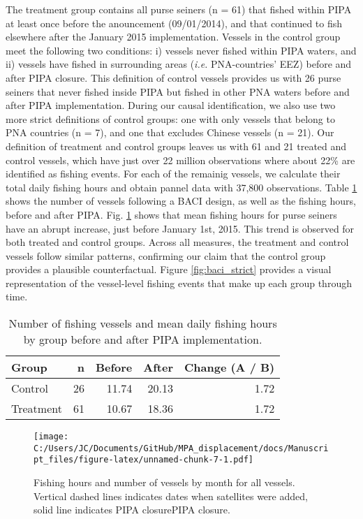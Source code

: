 \documentclass[11pt,]{article}
\begin{document}
The treatment group contains all purse seiners (n = 61) that fished
within PIPA at least once before the anouncement (09/01/2014), and that
continued to fish elsewhere after the January 2015 implementation.
Vessels in the control group meet the following two conditions: i)
vessels never fished within PIPA waters, and ii) vessels have fished in
surrounding areas (\emph{i.e.} PNA-countries' EEZ) before and after PIPA
closure. This definition of control vessels provides us with 26 purse
seiners that never fished inside PIPA but fished in other PNA waters
before and after PIPA implementation. During our causal identification,
we also use two more strict definitions of control groups: one with only
vessels that belong to PNA countries (n = 7), and one that excludes
Chinese vessels (n = 21). Our definition of treatment and control groups
leaves us with 61 and 21 treated and control vessels, which have just
over 22 million observations where about 22\% are identified as fishing
events. For each of the remainig vessels, we calculate their total daily
fishing hours and obtain pannel data with 37,800 observations. Table
\ref{tab:baci_n_s} shows the number of vessels following a BACI design,
as well as the fishing hours, before and after PIPA. Fig.
\ref{fig:all_vessels} shows that mean fishing hours for purse seiners
have an abrupt increase, just before January 1st, 2015. This trend is
observed for both treated and control groups. Across all measures, the
treatment and control vessels follow similar patterns, confirming our
claim that the control group provides a plausible counterfactual. Figure
\ref{fig:baci_strict} provides a visual representation of the
vessel-level fishing events that make up each group through time.

\begin{table}[H]

\caption{\label{tab:unnamed-chunk-6}\label{tab:baci_n_s}Number of fishing vessels and mean daily fishing hours by group before and after PIPA implementation.}
\centering
\begin{tabular}[t]{lrrrr}
\toprule
Group & n & Before & After & Change (A / B)\\
\midrule
Control & 26 & 11.74 & 20.13 & 1.72\\
Treatment & 61 & 10.67 & 18.36 & 1.72\\
\bottomrule
\end{tabular}
\end{table}

\begin{figure}
\centering
\texttt{[image: C:/Users/JC/Documents/GitHub/MPA\_displacement/docs/Manuscript\_files/figure-latex/unnamed-chunk-7-1.pdf]}
\caption{\label{fig:unnamed-chunk-7}\label{fig:all_vessels}Fishing hours and
number of vessels by month for all vessels. Vertical dashed lines
indicates dates when satellites were added, solid line indicates PIPA
closurePIPA closure.}
\end{figure}
\end{document}
